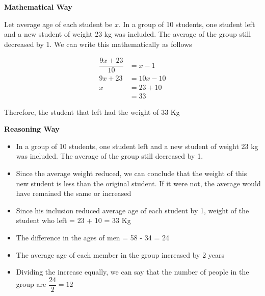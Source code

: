 \begin{multicols}{2}
    \textbf{Mathematical Way}

    Let average age of each student be $x$. In a group of 10 students, one student left and a new student of weight 23 kg was included. The average of the group still decreased by 1. We can write this mathematically as follows 

    \begin{align*}
        \dfrac{9x + 23}{10} &= x - 1 \tag{Weight of 9 students + new included student} \\
        9x + 23 &= 10x - 10 \\
        x &= 23 + 10 \\
        &= 33
    \end{align*}

    Therefore, the student that left had the weight of 33 Kg

    \columnbreak

    \textbf{Reasoning Way}
    \begin{itemize}
        \item In a group of 10 students, one student left and a new student of weight 23 kg was included. The average of the group still decreased by 1.
        \item Since the average weight reduced, we can conclude that the weight of this new student is less than the original student. If it were not, the average would have remained the same or increased
        \item Since his inclusion reduced average age of each student by 1, weight of the student who left = 23 + 10 = 33 Kg
    \end{itemize}

\end{multicols}


\begin{itemize}
    \item The difference in the ages of men = 58 - 34 = 24
    \item The average age of each member in the group increased by 2 years
    \item Dividing the increase equally, we can say that the number of people in the group are $\dfrac{24}{2} = 12$
\end{itemize}

